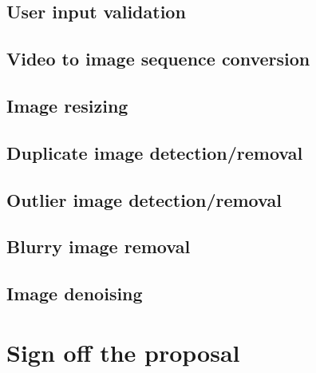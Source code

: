 \documentclass[11pt]{report}
\begin{document}
\subsection{User input validation}
\subsection{Video to image sequence conversion}
\subsection{Image resizing}
\subsection{Duplicate image detection/removal}
\subsection{Outlier image detection/removal}
\subsection{Blurry image removal}
\subsection{Image denoising}

\section{Sign off the proposal}
\end{document}
